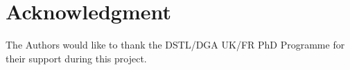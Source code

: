 \documentclass[conference]{IEEEtran}
\begin{document}
\section*{Acknowledgment}

 The Authors would like to thank the DSTL/DGA UK/FR PhD Programme for their support during this project.






%
%
%




\end{document}
